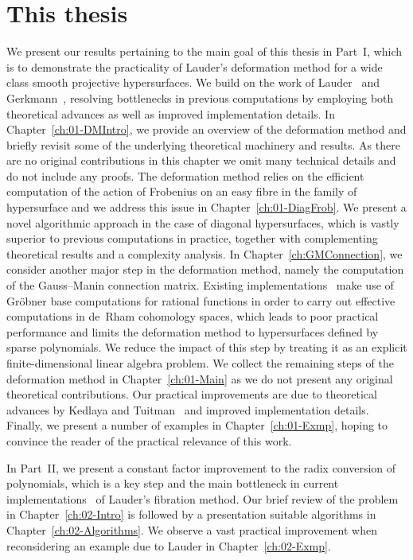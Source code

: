 \section{This thesis}

We present our results pertaining to the main goal of this thesis in 
Part~{I}, which is to demonstrate the practicality of Lauder's deformation 
method for a wide class smooth projective hypersurfaces.  We build on 
the work of Lauder~\citep{Lau04a} and Gerkmann~\citep{Gerkmann2007}, 
resolving bottlenecks in previous computations by employing both theoretical 
advances as well as improved implementation details.  
In Chapter~\ref{ch:01-DMIntro}, we provide an overview of the deformation 
method and briefly revisit some of the underlying theoretical machinery 
and results.  As there are no original contributions in this chapter we 
omit many technical details and do not include any proofs.  
The deformation method relies on the efficient computation of the 
action of Frobenius on an easy fibre in the family of hypersurface 
and we address this issue in Chapter~\ref{ch:01-DiagFrob}.  We present 
a novel algorithmic approach in the case of diagonal hypersurfaces, 
which is vastly superior to previous computations in practice, together 
with complementing theoretical results and a complexity analysis.
In Chapter~\ref{ch:GMConnection}, we consider another major step in the 
deformation method, namely the computation of the Gauss--Manin connection 
matrix.  Existing implementations~\citep{Lau04a,Gerkmann2007,Kedlaya2011} 
make use of Gr\"obner base computations for rational functions in order 
to carry out effective computations in de~Rham cohomology spaces, which 
leads to poor practical performance and limits the deformation method to 
hypersurfaces defined by sparse polynomials.  We reduce the impact 
of this step by treating it as an explicit finite-dimensional linear 
algebra problem.  We collect the remaining steps of the deformation 
method in Chapter~\ref{ch:01-Main}  as we do not present any original 
theoretical contributions.  Our practical improvements are due to 
theoretical advances by Kedlaya and Tuitman~\citep{KedlayaTuitman2012} 
and improved implementation details.  Finally, we present a number of 
examples in Chapter~\ref{ch:01-Exmp}, hoping to convince the reader of 
the practical relevance of this work.

In Part~{II}, we present a constant factor improvement to the 
radix conversion of polynomials, which is a key step and the 
main bottleneck in current implementations~\citep{Lauder2006,Walker2009} 
of Lauder's fibration method.  Our brief review of the problem 
in Chapter~\ref{ch:02-Intro} is followed by a presentation suitable 
algorithms in Chapter~\ref{ch:02-Algorithms}.  We observe a vast 
practical improvement when reconsidering an example due to Lauder 
in Chapter~\ref{ch:02-Exmp}.

